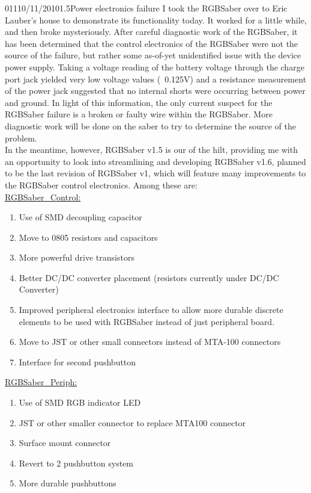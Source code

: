 \documentclass[12pt,letterpaper,onecolumn]{article}
\begin{document}
\begin{nbentry}{011}{10/11/2010}{1.5}{Power electronics failure}
\indent I took the RGBSaber over to Eric Lauber's house to demonstrate its functionality today. It worked for a little while, and then broke mysteriously. After careful diagnostic work of the RGBSaber, it has been determined that the control electronics of the RGBSaber were not the source of the failure, but rather some as-of-yet unidentified issue with the device power supply. Taking a voltage reading of the battery voltage through the charge port jack yielded very low voltage values (~0.125V) and a resistance measurement of the power jack suggested that no internal shorts were occurring between power and ground. In light of this information, the only current suspect for the RGBSaber failure is a broken or faulty wire within the RGBSaber. More diagnostic work will be done on the saber to try to determine the source of the problem. \\
\indent In the meantime, however, RGBSaber v1.5 is our of the hilt, providing me with an opportunity to look into streamlining and developing RGBSaber v1.6, planned to be the last revision of RGBSaber v1, which will feature many improvements to the RGBSaber control electronics. Among these are: \\
\underline{RGBSaber\_Control:}
\begin{enumerate}
\item Use of SMD decoupling capacitor
\item Move to 0805 resistors and capacitors
\item More powerful drive transistors
\item Better DC/DC converter placement (resistors currently under DC/DC Converter)
\item Improved peripheral electronics interface to allow more durable discrete elements to be used with RGBSaber instead of just peripheral board.
\item Move to JST or other small connectors instead of MTA-100 connectors
\item Interface for second pushbutton
\end{enumerate} 

\underline{RGBSaber\_Periph:}
\begin{enumerate}
\item Use of SMD RGB indicator LED
\item JST or other smaller connector to replace MTA100 connector
\item Surface mount connector
\item Revert to 2 pushbutton system
\item More durable pushbuttons
\end{enumerate}
\end{nbentry}
\end{document}
